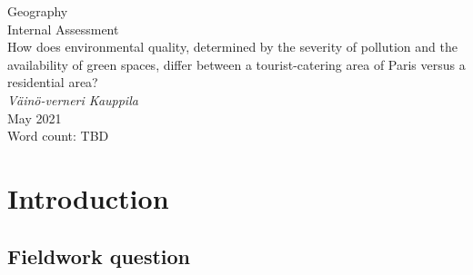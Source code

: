 \documentclass[11pt,letterpaper]{article}
\begin{document}



\begin{titlepage}
    \begin{center}
        \vspace*{4cm}
        Geography\\
        Internal Assessment \\
        \vspace{1cm}
        How does environmental quality, determined by the severity of pollution and the availability of green spaces, differ between a tourist-catering area of Paris versus a residential area? \\
        \vspace{1cm}
        \textit{Väinö-verneri Kauppila} \\
        May 2021 \\
        \vspace{4cm}
        Word count: TBD \\
        \vfill
        \vspace{0.1cm}
    \end{center}
\end{titlepage}



\begin{center}
    \tableofcontents
    \vspace{1in}

\end{center}



\newpage


\section{Introduction}

\subsection{Fieldwork question}
\end{document}
